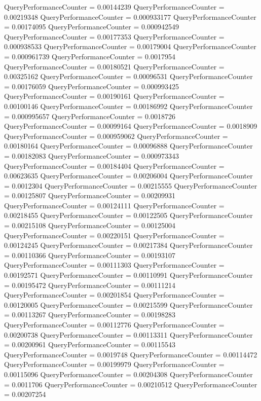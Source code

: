 \documentclass[9pt]{article}
\theoremstyle{plain}
\theoremstyle{definition}
\theoremstyle{remark}
\numberwithin{equation}{section}
\begin{document}
QueryPerformanceCounter  =  0.00144239
QueryPerformanceCounter  =  0.00219348
QueryPerformanceCounter  =  0.000933177
QueryPerformanceCounter  =  0.00174095
QueryPerformanceCounter  =  0.000942549
QueryPerformanceCounter  =  0.00177353
QueryPerformanceCounter  =  0.000938533
QueryPerformanceCounter  =  0.00179004
QueryPerformanceCounter  =  0.000961739
QueryPerformanceCounter  =  0.0017954
QueryPerformanceCounter  =  0.00180521
QueryPerformanceCounter  =  0.00325162
QueryPerformanceCounter  =  0.00096531
QueryPerformanceCounter  =  0.00176059
QueryPerformanceCounter  =  0.000993425
QueryPerformanceCounter  =  0.00190161
QueryPerformanceCounter  =  0.00100146
QueryPerformanceCounter  =  0.00186992
QueryPerformanceCounter  =  0.000995657
QueryPerformanceCounter  =  0.0018726
QueryPerformanceCounter  =  0.00099164
QueryPerformanceCounter  =  0.0018909
QueryPerformanceCounter  =  0.000959062
QueryPerformanceCounter  =  0.00180164
QueryPerformanceCounter  =  0.00096888
QueryPerformanceCounter  =  0.00182083
QueryPerformanceCounter  =  0.000973343
QueryPerformanceCounter  =  0.00184404
QueryPerformanceCounter  =  0.00623635
QueryPerformanceCounter  =  0.00206004
QueryPerformanceCounter  =  0.0012304
QueryPerformanceCounter  =  0.00215555
QueryPerformanceCounter  =  0.00125807
QueryPerformanceCounter  =  0.00209931
QueryPerformanceCounter  =  0.00124111
QueryPerformanceCounter  =  0.00218455
QueryPerformanceCounter  =  0.00122505
QueryPerformanceCounter  =  0.00215108
QueryPerformanceCounter  =  0.00125004
QueryPerformanceCounter  =  0.00220151
QueryPerformanceCounter  =  0.00124245
QueryPerformanceCounter  =  0.00217384
QueryPerformanceCounter  =  0.00110366
QueryPerformanceCounter  =  0.00193107
QueryPerformanceCounter  =  0.00111303
QueryPerformanceCounter  =  0.00192571
QueryPerformanceCounter  =  0.00110991
QueryPerformanceCounter  =  0.00195472
QueryPerformanceCounter  =  0.00111214
QueryPerformanceCounter  =  0.00201854
QueryPerformanceCounter  =  0.00120005
QueryPerformanceCounter  =  0.00215599
QueryPerformanceCounter  =  0.00113267
QueryPerformanceCounter  =  0.00198283
QueryPerformanceCounter  =  0.00112776
QueryPerformanceCounter  =  0.00200738
QueryPerformanceCounter  =  0.00113311
QueryPerformanceCounter  =  0.00200961
QueryPerformanceCounter  =  0.00115543
QueryPerformanceCounter  =  0.0019748
QueryPerformanceCounter  =  0.00114472
QueryPerformanceCounter  =  0.00199979
QueryPerformanceCounter  =  0.00115096
QueryPerformanceCounter  =  0.00204308
QueryPerformanceCounter  =  0.0011706
QueryPerformanceCounter  =  0.00210512
QueryPerformanceCounter  =  0.00207254
\end{document}
